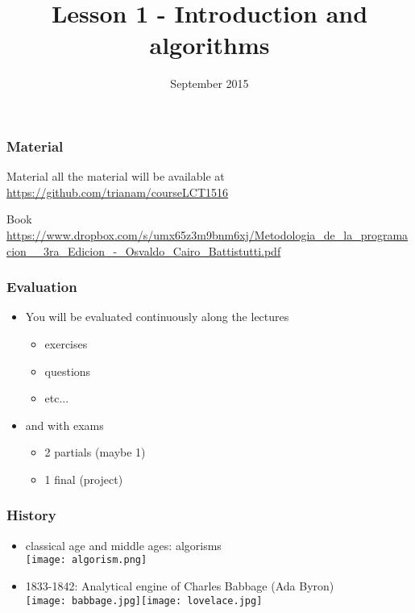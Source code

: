 


\title[Lesson 1]{\textbf{Lesson 1 - Introduction and algorithms}}
\date[7/9/15]{ September 2015}



\begin{frame}[plain]
  \titlepage
\end{frame}

\begin{frame}
  \frametitle{Material}
  \begin{block}{Material}
    all the material will be available at \url{https://github.com/trianam/courseLCT1516}
  \end{block}
  \pause
  \begin{block}{Book}
    \url{https://www.dropbox.com/s/umx65z3m9bnm6xj/Metodologia_de_la_programacion__3ra_Edicion_-_Osvaldo_Cairo_Battistutti.pdf}
  \end{block}
\end{frame}

\begin{frame}
  \frametitle{Evaluation}
    \begin{itemize}
  \item You will be evaluated continuously along the lectures
    \begin{itemize}
    \item exercises
    \item questions
    \item etc...
    \end{itemize}
  \item and with exams
    \begin{itemize}
    \item 2 partials (maybe 1)
    \item 1 final (project)
    \end{itemize}
  \end{itemize}
\end{frame}

\begin{frame}
  \frametitle{History}
  \begin{itemize}
  \item classical age and middle ages: \alert{algorisms} \\\texttt{[image: algorism.png]}
  \item 1833-1842: \alert{Analytical engine} of Charles
    Babbage (Ada Byron) \\\texttt{[image: babbage.jpg]}\texttt{[image: lovelace.jpg]}
  \end{itemize}
\end{frame}

